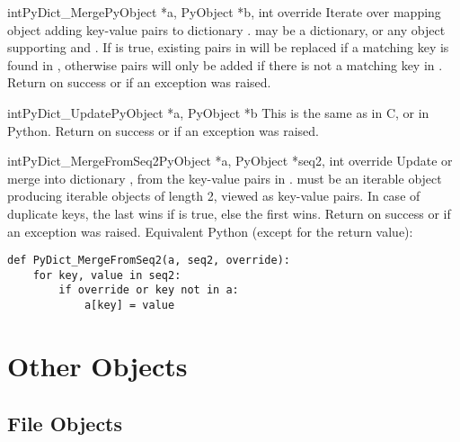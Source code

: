 \begin{cfuncdesc}{int}{PyDict_Merge}{PyObject *a, PyObject *b, int override}
  Iterate over mapping object  adding key-value pairs to dictionary
  .
   may be a dictionary, or any object supporting
   and .
  If  is true, existing pairs in  will
  be replaced if a matching key is found in , otherwise pairs
  will only be added if there is not a matching key in .
  Return  on success or  if an exception was
  raised.
\end{cfuncdesc}

\begin{cfuncdesc}{int}{PyDict_Update}{PyObject *a, PyObject *b}
  This is the same as  in C,
  or  in Python.  Return  on
  success or  if an exception was raised.
\end{cfuncdesc}

\begin{cfuncdesc}{int}{PyDict_MergeFromSeq2}{PyObject *a, PyObject *seq2,
                                             int override}
  Update or merge into dictionary , from the key-value pairs in
  .   must be an iterable object producing
  iterable objects of length 2, viewed as key-value pairs.  In case of
  duplicate keys, the last wins if  is true, else the
  first wins.
  Return  on success or  if an exception
  was raised.
  Equivalent Python (except for the return value):

\begin{verbatim}
def PyDict_MergeFromSeq2(a, seq2, override):
    for key, value in seq2:
        if override or key not in a:
            a[key] = value
\end{verbatim}

\end{cfuncdesc}


\section{Other Objects \label{otherObjects}}

\subsection{File Objects \label{fileObjects}}

